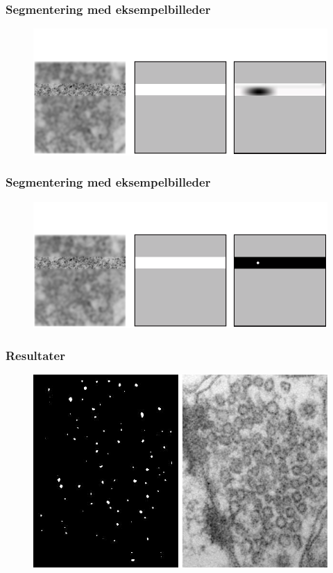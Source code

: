 \documentclass[12pt,t]{beamer}
\begin{document}
\begin{frame}
\frametitle{Segmentering med eksempelbilleder}
\begin{figure}[H]
\includegraphics[scale=0.35]{img/afstand/15.png}
\end{figure}
\end{frame}

\begin{frame}
\frametitle{Segmentering med eksempelbilleder}
\begin{figure}[H]
\includegraphics[scale=0.35]{img/afstand/16.png}
\end{figure}
\end{frame}




\begin{frame}
\frametitle{Resultater}
\begin{figure}[H]
	\centering
	\includegraphics[scale=0.4]{img/finalmethod/thres_plot_before.png}
\end{figure}
\end{frame}
\end{document}
